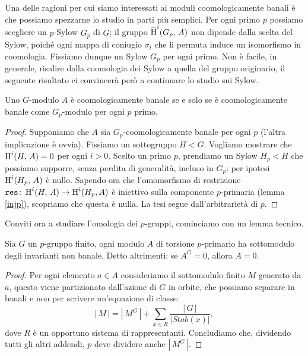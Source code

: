 Una delle ragioni per cui siamo interessati ai moduli coomologicamente banali è che possiamo spezzarne lo studio in parti più semplici. Per ogni primo $ p $ possiamo scegliere un $ p $-Sylow $ G_p $ di $ G $; il gruppo $ \operatorname{\widehat{H}}^i(G_p, \, A) $ non dipende dalla scelta del Sylow, poiché ogni mappa di coniugio $ \sigma_t $ che li permuta induce un isomorfismo in coomologia. Fissiamo dunque un Sylow $ G_p $ per ogni primo. Non è facile, in generale, risalire dalla coomologia dei Sylow a quella del gruppo originario, il seguente risultato ci convincerà però a continuare lo studio sui Sylow.

\begin{lemma}
	Uno $ G $-modulo $ A $ è coomologicamente banale se e solo se è coomologicamente banale come $ G_p $-modulo per ogni $ p $ primo.
\end{lemma}
\begin{proof}
	Supponiamo che $ A $ sia $ G_p $-coomologicamente banale per ogni $ p $ (l'altra implicazione è ovvia). Fissiamo un sottogruppo $ H < G $. Vogliamo mostrare che
	$  \operatorname{H}^i(H, \, A) = 0 $ per ogni $ i > 0 $. Scelto un primo $ p $, prendiamo un Sylow $ H_p < H $ che possiamo supporre, senza perdita di generalità, incluso in $ G_p $: per ipotesi $ \operatorname{H}^i(H_p, \, A) $ è nullo.
	Sapendo ora che l'omomorfismo di restrizione $ \operatorname{\mathtt{res}} \colon \operatorname{H}^i(H, \, A) \to \operatorname{H}^i(H_p, A) $ è iniettivo sulla componente $ p $-primaria (lemma \ref{injp}), scopriamo che questa è nulla. La tesi segue dall'arbitrarietà di $ p $.
	
\end{proof}

Conviti ora a studiare l'omologia dei $ p $-gruppi, 
cominciamo con un lemma tecnico.

\begin{lemma}\label{ban1}
	Sia $ G $ un $ p $-gruppo finito, ogni modulo $ A $ di torsione $ p $-primario ha sottomodulo degli invarianti non banale. Detto altrimenti: se $ A^G = 0 $, allora $ A = 0 $.
\end{lemma}
\begin{proof}
	Per ogni elemento $ a \in A $ consideriamo il sottomodulo finito $ M $ generato da $ a $, questo viene partizionato dall'azione di $ G $ in orbite, che possiamo separare in banali e non per scrivere un'equazione di classe:
	\[ |\,M\,| = |\, M^G\,| +\sum_{x \in R} \frac{|\,G\,|}{|Stab(x)|},  \]
	dove $ R $ è un opportuno sistema di rappresentanti. Concludiamo che, dividendo tutti gli altri addendi, $ p $ deve dividere anche $ |\, M^G \, | $.
\end{proof}


